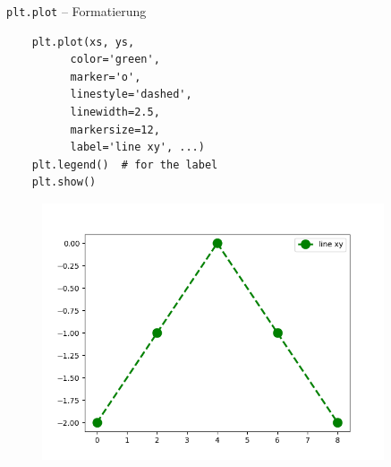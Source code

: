 \documentclass[utf8, smaller, c]{beamer}
\renewcommand{\tt}[1]{{\texttt{#1}}}
\begin{document}
\begin{frame}{\tt{plt.plot} -- Formatierung}
	\vspace{-2mm}
	\begin{minipage}{0.4\textwidth}
		\begin{lstlisting}
	plt.plot(xs, ys,
	      color='green',
	      marker='o',
	      linestyle='dashed',
	      linewidth=2.5,
          markersize=12,
	      label='line xy', ...)
	plt.legend()  # for the label
	plt.show()
		\end{lstlisting}
	\end{minipage}
	\begin{minipage}{0.5\textwidth}
		\begin{figure}
			\includegraphics[width=0.9\textwidth]{pics/plot5}
		\end{figure}
	\end{minipage}
\end{frame}
\end{document}
